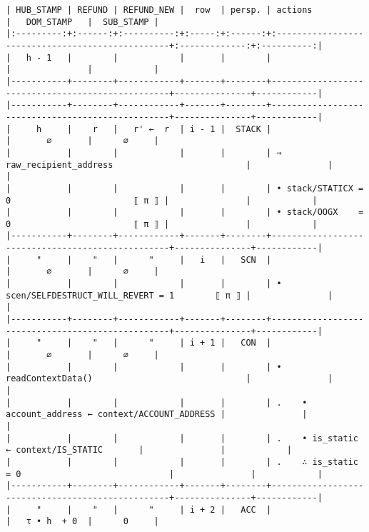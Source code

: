 \documentclass[varwidth=\maxdimen,margin=0.5cm,multi={verbatim}]{standalone}
\begin{document}
\begin{verbatim}
| HUB_STAMP | REFUND | REFUND_NEW |  row  | persp. | actions                                          |   DOM_STAMP   |  SUB_STAMP |
|:---------:+:------:+:----------:+:-----:+:------:+:-------------------------------------------------+:-------------:+:----------:|
|   h - 1   |        |            |       |        |                                                  |               |            |
|-----------+--------+------------+-------+--------+--------------------------------------------------+---------------+------------|
|-----------+--------+------------+-------+--------+--------------------------------------------------+---------------+------------|
|     h     |    r   |   r' ←  r  | i - 1 |  STACK |                                                  |       ∅       |      ∅     |
|           |        |            |       |        | ⇒ raw_recipient_address                          |               |            |
|           |        |            |       |        | • stack/STATICX = 0                        ⟦ π ⟧ |               |            |
|           |        |            |       |        | • stack/OOGX    = 0                        ⟦ π ⟧ |               |            |
|-----------+--------+------------+-------+--------+--------------------------------------------------+---------------+------------|
|     "     |    "   |      "     |   i   |   SCN  |                                                  |       ∅       |      ∅     |
|           |        |            |       |        | • scen/SELFDESTRUCT_WILL_REVERT = 1        ⟦ π ⟧ |               |            |
|-----------+--------+------------+-------+--------+--------------------------------------------------+---------------+------------|
|     "     |    "   |      "     | i + 1 |   CON  |                                                  |       ∅       |      ∅     |
|           |        |            |       |        | • readContextData()                              |               |            |
|           |        |            |       |        | .    • account_address ← context/ACCOUNT_ADDRESS |               |            |
|           |        |            |       |        | .    • is_static       ← context/IS_STATIC       |               |            |
|           |        |            |       |        | .    ∴ is_static = 0                             |               |            |
|-----------+--------+------------+-------+--------+--------------------------------------------------+---------------+------------|
|     "     |    "   |      "     | i + 2 |   ACC  |                                                  |   τ • h  + 0  |      0     |

\end{verbatim}
\end{document}
